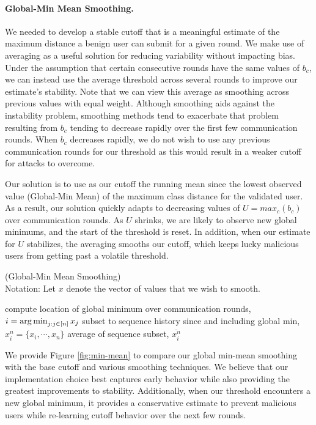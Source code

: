 \documentclass{article} %
\begin{document}
%
\paragraph{Global-Min Mean Smoothing. } We needed to develop a stable cutoff that is a meaningful estimate of the maximum distance a benign user can submit for a given round. We make use of averaging as a useful solution for reducing variability without impacting bias. Under the assumption that certain consecutive rounds have the same values of $b_c$, we can instead use the average threshold across several rounds to improve our estimate's stability. Note that we can view this average as smoothing across previous values with equal weight. Although smoothing aids against the instability problem, smoothing methods tend to exacerbate that problem resulting from $b_c$ tending to decrease rapidly over the first few communication rounds. When $b_c$ decreases rapidly, we do not wish to use any previous communication rounds for our threshold as this would result in a weaker cutoff for attacks to overcome. 

Our solution is to use as our cutoff the running mean since the lowest observed value (Global-Min Mean) of the maximum class distance for the validated user. As a result, our solution quickly adapts to decreasing values of $U = max_c (b_c)$ over communication rounds. As $U$ shrinks, we are likely to observe new global minimums, and the start of the threshold is reset. In addition, when our estimate for $U$ stabilizes, the averaging smooths our cutoff, which keeps lucky malicious users from getting past a volatile threshold. 

\begin{algorithm}[H]
\caption{ (Global-Min Mean Smoothing) \\ 
Notation: Let $x$ denote the vector of values that we wish to smooth.
}
\label{alg:smoothing}
\begin{algorithmic}[1]

        \State compute location of global minimum over communication rounds, $i = \operatorname*{arg\,min}_{j: j \in \mathopen[ n \mathclose]} x_j$
        \State subset to sequence history since and including global min, $x_i^n = \{x_i, \cdots, x_n \}$
        \State \Return average of sequence subset, $\overline{x_i^n}$
    \EndProcedure
\end{algorithmic}
\end{algorithm}

We provide Figure \ref{fig:min-mean} to compare our global min-mean smoothing with the base cutoff and various smoothing techniques. We believe that our implementation choice best captures early behavior while also providing the greatest improvements to stability. Additionally, when our threshold encounters a new global minimum, it provides a conservative estimate to prevent malicious users while re-learning cutoff behavior over the next few rounds.
\end{document}
